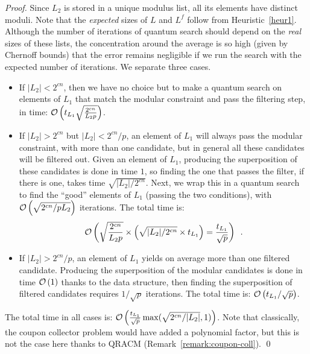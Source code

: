 \begin{proof}
Since $L_2$ is stored in a unique modulus list, all its elements have distinct moduli. Note that the \emph{expected} sizes of $L$ and $L^f$ follow from Heuristic~\ref{heur1}. Although the number of iterations of quantum search should depend on the \emph{real} sizes of these lists, the concentration around the average is so high (given by Chernoff bounds) that the error remains negligible if we run the search with the expected number of iterations. We separate three cases.
\begin{itemize}
\item If $|L_2| < 2^{cn}$, then we have no choice but to make a quantum search on elements of $L_1$ that match the modular constraint and pass the filtering step, in time: $\mathcal{O} \left( t_{L_1} \sqrt{ \frac{2^{cn}}{L_2 p} }  \right)$.

\item If $|L_2| > 2^{cn}$ but $|L_2| < 2^{cn} / p$, an element of $L_1$ will always pass the modular constraint, with more than one candidate, but in general all these candidates will be filtered out. Given an element of $L_1$, producing the superposition of these candidates is done in time $1$, so finding the one that passes the filter, if there is one, takes time $\sqrt{|L_2|/2^{cn}}$. Next, we wrap this in a quantum search to find the ``good'' elements of $L_1$ (passing the two conditions), with $ \mathcal{O} \left(\sqrt{ 2^{cn} / p L_2} \right)$ iterations. The total time is:
$$\mathcal{O} \left( \sqrt{ \frac{2^{cn}}{L_2 p} } \times \left(  \sqrt{|L_2|/2^{cn}} \times t_{L_1} \right) =  \frac{t_{L_1}}{\sqrt{p}}  \right)\enspace. $$

\item If $|L_2| > 2^{cn}/ p$, an element of $L_1$ yields on average more than one filtered candidate. Producing the superposition of the modular candidates is done in time $\mathcal{O} \left(1 \right)$ thanks to the data structure, then finding the superposition of filtered candidates requires $1/\sqrt{p}$ iterations. The total time is: $\mathcal{O} \left( t_{L_1} / \sqrt{p}  \right)$.
\end{itemize}
The total time in all cases is: $\mathcal{O} \left( \frac{t_{L_1}}{\sqrt{p}} \max( \sqrt{2^{cn} / |L_2|} , 1 )  \right)$. Note that classically, the coupon collector problem would have added a polynomial factor, but this is not the case here thanks to QRACM (Remark~\ref{remark:coupon-coll}). \qed
\end{proof}



